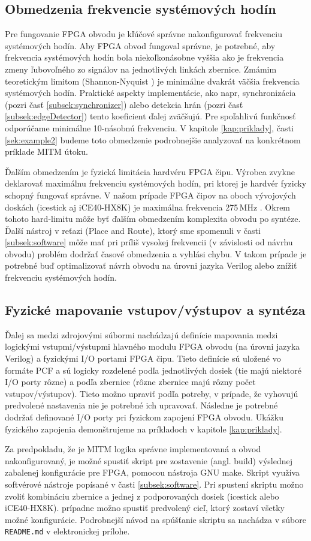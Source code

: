 \subsection{Obmedzenia frekvencie systémových hodín} \label{subsek:sysFreq}
Pre fungovanie FPGA obvodu je kľúčové správne nakonfigurovať frekvenciu systémových hodín. Aby FPGA obvod fungoval správne, je potrebné, aby frekvencia systémových hodín bola niekoľkonásobne vyššia ako je frekvencia zmeny ľubovoľného zo signálov na jednotlivých linkách zbernice. Zmámim teoretickým limitom (Shannon-Nyquist \cite{shannonNyquist}) je minimálne dvakrát väčšia frekvencia systémových hodín. Praktické aspekty implementácie, ako napr, synchronizácia (pozri časť \ref{subsek:synchronizer}) alebo detekcia hrán (pozri časť \ref{subsek:edgeDetector}) tento koeficient ďalej zväčšujú. Pre spoľahlivú funkčnosť odporúčame minimálne 10-násobnú frekvenciu. V kapitole \ref{kap:priklady}, časti \ref{sek:example2} budeme toto obmedzenie podrobnejšie analyzovať na konkrétnom príklade MITM útoku.

Ďalším obmedzením je fyzická limitácia hardvéru FPGA čipu. Výrobca zvykne deklarovať maximálnu frekvenciu systémových hodín, pri ktorej je hardvér fyzicky schopný fungovať správne. V našom prípade FPGA čipov na oboch vývojových doskách (icestick aj iCE40-HX8K) je maximálna frekvencia 275\,MHz \cite{lphxFamily}. Okrem tohoto hard-limitu môže byť ďalším obmedzením komplexita obvodu po syntéze. Ďalší nástroj v reťazi (Place and Route), ktorý sme spomenuli v časti \ref{subsek:software} môže mať pri príliš vysokej frekvencii (v závislosti od návrhu obvodu) problém dodržať časové obmedzenia a vyhlási chybu. V takom prípade je potrebné buď optimalizovať návrh obvodu na úrovni jazyka Verilog alebo znížiť frekvenciu systémových hodín.

\subsection{Fyzické mapovanie vstupov/výstupov a syntéza}
Ďalej sa medzi zdrojovými súbormi nachádzajú definície mapovania medzi logickými vstupmi/výstupmi hlavného modulu FPGA obvodu (na úrovni jazyka Verilog) a fyzickými I/O portami FPGA čipu. Tieto definície sú uložené vo formáte PCF a sú logicky rozdelené podľa jednotlivých dosiek (tie majú niektoré I/O porty rôzne) a podľa zbernice (rôzne zbernice majú rôzny počet vstupov/výstupov). Tieto možno upraviť podľa potreby, v prípade, že vyhovujú predvolené nastavenia nie je potrebné ich upravovať. Následne je potrebné dodržať definované I/O porty pri fyzickom zapojení FPGA obvodu. Ukážku fyzického zapojenia demonštrujeme na príkladoch v kapitole \ref{kap:priklady}. 

Za predpokladu, že je MITM logika správne implementovaná a obvod nakonfigurovaný, je možné spustiť skript pre zostavenie (angl. build) výslednej zabalenej konfigurácie pre FPGA, pomocou nástroja GNU make. Skript využíva softvérové nástroje popísané v časti \ref{subsek:software}. Pri spustení skriptu možno zvoliť kombináciu zbernice a jednej z podporovaných dosiek (icestick alebo iCE40-HX8K). prípadne možno spustiť predvolený cieľ, ktorý zostaví všetky možné konfigurácie. Podrobnejší návod na spúšťanie skriptu sa nachádza v súbore \texttt{README.md} v elektronickej prílohe.